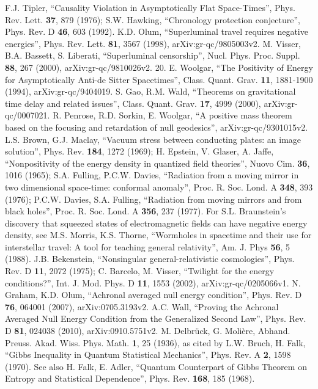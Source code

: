 \documentclass{article}
\begin{document}
\begin{thebibliography}{99}
F.J. Tipler, ``Causality Violation in Asymptotically Flat Space-Times'', Phys. Rev. Lett. \textbf{37}, 879 (1976); 
S.W. Hawking, ``Chronology protection conjecture'', Phys. Rev. D \textbf{46}, 603 (1992).
K.D. Olum, ``Superluminal travel requires negative energies'', Phys. Rev. Lett. \textbf{81}, 3567 (1998), arXiv:gr-qc/9805003v2.
M. Visser, B.A. Bassett, S. Liberati, ``Superluminal censorship'', Nucl. Phys. Proc. Suppl. \textbf{88}, 267 (2000), arXiv:gr-qc/9810026v2.
20.
E. Woolgar, ``The Positivity of Energy for Asymptotically Anti-de Sitter Spacetimes'', Class. Quant. Grav. \textbf{11}, 1881-1900 (1994), arXiv:gr-qc/9404019.
S. Gao, R.M. Wald, ``Theorems on gravitational time delay and related issues'', Class. Quant. Grav. \textbf{17}, 4999 (2000), 	arXiv:gr-qc/0007021.
R. Penrose, R.D. Sorkin, E. Woolgar, ``A positive mass theorem based on the focusing and retardation of null geodesics'', arXiv:gr-qc/9301015v2.
L.S. Brown, G.J. Maclay, ``Vacuum stress between conducting plates: an image solution'', Phys. Rev. \textbf{184}, 1272 (1969); 
H. Epstein, V. Glaser, A. Jaffe, ``Nonpositivity of the energy density in quantized field theories'', Nuovo Cim. \textbf{36}, 1016 (1965);
S.A. Fulling, P.C.W. Davies, ``Radiation from a moving mirror in two dimensional space-time: conformal anomaly'', 
Proc. R. Soc. Lond. A \textbf{348}, 393 (1976); 
P.C.W. Davies, S.A. Fulling, ``Radiation from moving mirrors and from black holes'', Proc. R. Soc. Lond. A \textbf{356}, 237 (1977). 
For S.L. Braunstein's discovery that squeezed states of electromagnetic fields can have negative energy density, see M.S. Morris, 
K.S. Thorne, ``Wormholes in spacetime and their use for interstellar travel: A tool for teaching general relativity'', Am. J. Phys \textbf{56}, 5 (1988).
J.B. Bekenstein, ``Nonsingular general-relativistic cosmologies'', Phys. Rev. D \textbf{11}, 2072 (1975);
C. Barcelo, M. Visser, ``Twilight for the energy conditions?'', Int. J. Mod. Phys. D \textbf{11}, 1553 (2002), arXiv:gr-qc/0205066v1.
N. Graham, K.D. Olum, ``Achronal averaged null energy condition'', Phys. Rev. D \textbf{76}, 064001 (2007), arXiv:0705.3193v2.
A.C. Wall, ``Proving the Achronal Averaged Null Energy Condition from the Generalized Second Law'', Phys. Rev. D \textbf{81}, 024038 (2010), arXiv:0910.5751v2.
M. Delbr\"uck, G. Moli\`ere, Abhand. Preuss. Akad. Wiss. Phys. Math. \textbf{1}, 25 (1936), as cited by L.W. Bruch, H. Falk, ``Gibbs Inequality in Quantum Statistical Mechanics'', Phys. Rev. A \textbf{2}, 1598 (1970).  See also H. Falk, E. Adler, ``Quantum Counterpart of Gibbs Theorem on Entropy and Statistical Dependence'', Phys. Rev. \textbf{168}, 185 (1968).

\end{thebibliography}
\end{document}
